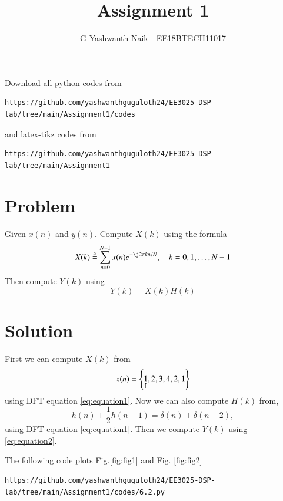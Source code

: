 \documentclass[journal,12pt,twocolumn]{IEEEtran}
\begin{document}
\def\putbox#1#2#3{\makebox[0in][l]{\makebox[#1][l]{}\raisebox{\baselineskip}[0in][0in]{\raisebox{#2}[0in][0in]{#3}}}}
     \def\rightbox#1{\makebox[0in][r]{#1}}
     \def\centbox#1{\makebox[0in]{#1}}
     \def\topbox#1{\raisebox{-\baselineskip}[0in][0in]{#1}}
     \def\midbox#1{\raisebox{-0.5\baselineskip}[0in][0in]{#1}}
\vspace{3cm}
\title{Assignment 1}
\author{G Yashwanth Naik - EE18BTECH11017}
\maketitle
\newpage
\bigskip
\renewcommand{\thefigure}{\theenumi}
\renewcommand{\thetable}{\theenumi}
Download all python codes from 
\begin{lstlisting}
https://github.com/yashwanthguguloth24/EE3025-DSP-lab/tree/main/Assignment1/codes
\end{lstlisting}
%
and latex-tikz codes from 
%
\begin{lstlisting}
https://github.com/yashwanthguguloth24/EE3025-DSP-lab/tree/main/Assignment1
\end{lstlisting}
\section{Problem}
Given $x(n)$ and $y(n)$. Compute $X(k)$ using the formula 
\begin{equation}
X(k) \define \sum _{n=0}^{N-1}x(n) e^{-\j 2\pi kn/N}, \quad k = 0,1,\dots, N-1
\label{eq:equation1}
\end{equation}
Then compute $Y(k)$ using 
\begin{equation}
Y(k) = X(k)H(k)
\label{eq:equation2}
\end{equation}

\section{Solution}
First we can compute $X(k)$ from
\begin{equation}
x(n) = \left\{\underset{\uparrow}{1},2,3,4,2,1\right\}
\end{equation}
using DFT equation \eqref{eq:equation1}. 
Now we can also compute $H(k)$ from,
\begin{equation}
\label{eq:iir_filter_h}
h(n) + \frac{1}{2}h(n-1) = \delta(n) + \delta(n-2), 
\end{equation}
using DFT equation \eqref{eq:equation1}. 
Then we compute $Y(k)$ using \eqref{eq:equation2}.


The following code plots Fig.\ref{fig:fig1}  and Fig. \ref{fig:fig2}
\begin{lstlisting}
https://github.com/yashwanthguguloth24/EE3025-DSP-lab/tree/main/Assignment1/codes/6.2.py
\end{lstlisting}
\end{document}
